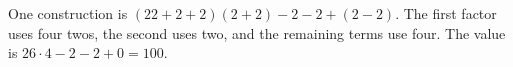 One construction is $\boxed{(22+2+2)(2+2)-2-2+(2-2)}$. The first factor uses four twos, the second uses two, and the remaining terms use four. The value is $26\cdot4-2-2+0=100$.
